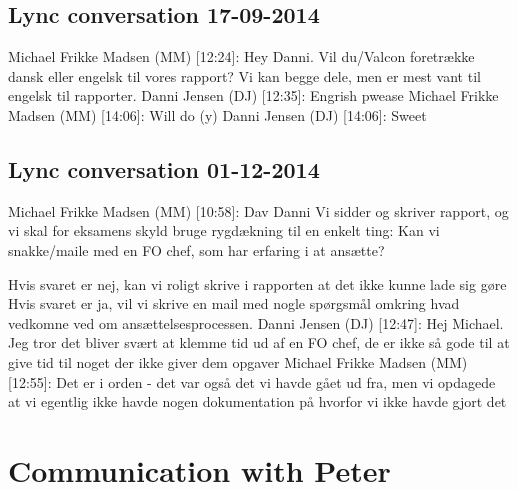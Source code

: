 \begin{linenumbers*}
\subsection{Lync conversation 17-09-2014}
Michael Frikke Madsen (MM) [12:24]: 
Hey Danni. Vil du/Valcon foretrække dansk eller engelsk til vores rapport?
Vi kan begge dele, men er mest vant til engelsk til rapporter. \newline
Danni Jensen (DJ) [12:35]: 
Engrish pwease \newline
Michael Frikke Madsen (MM) [14:06]: 
Will do (y) \newline
Danni Jensen (DJ) [14:06]: 
Sweet

\subsection{Lync conversation 01-12-2014}
Michael Frikke Madsen (MM) [10:58]: 
Dav Danni
Vi sidder og skriver rapport, og vi skal for eksamens skyld bruge rygdækning til en enkelt ting:
Kan vi snakke/maile med en FO chef, som har erfaring i at ansætte?

Hvis svaret er nej, kan vi roligt skrive i rapporten at det ikke kunne lade sig gøre
Hvis svaret er ja, vil vi skrive en mail med nogle spørgsmål omkring hvad vedkomne ved om ansættelsesprocessen. \newline
Danni Jensen (DJ) [12:47]: 
Hej Michael. Jeg tror det bliver svært at klemme tid ud af en FO chef, de er ikke så gode til at give tid til noget der ikke giver dem opgaver \newline
Michael Frikke Madsen (MM) [12:55]: 
Det er i orden - det var også det vi havde gået ud fra, men vi opdagede at vi egentlig ikke havde nogen dokumentation på hvorfor vi ikke havde gjort det 

\section{Communication with Peter}


\end{linenumbers*}
